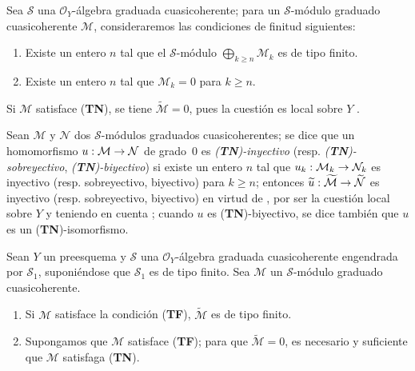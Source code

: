 \documentclass[oneside,10pt]{amsart}
\makeatletter
\renewcommand{\geq}{\geqslant}
\newcommand{\ega@arrow}[2]{\mathchoice{#1}{#2}{#2}{#2}}
\renewcommand{\to}{\ega@arrow{\longrightarrow}{\rightarrow}}
\let\EGAOriginalLabel\label
\renewcommand{\label}[1]{\phantomsection\EGAOriginalLabel{#1}}
\makeatother
\begin{document}
\begin{env}[3.4.2]
\label{II.3.4.2-fr}
Sea $\mathcal{S}$ una $\mathcal{O}_Y$-álgebra graduada cuasicoherente; para un $\mathcal{S}$-módulo graduado cuasicoherente $\mathcal{M}$, consideraremos las condiciones de finitud siguientes:
\begin{enumerate}
  \item[(\textbf{TF})] Existe un entero $n$ tal que el $\mathcal{S}$-módulo $\bigoplus_{k\geq n}\mathcal{M}_k$ es de tipo finito.
  \item[(\textbf{TN})] Existe un entero $n$ tal que $\mathcal{M}_k=0$ para $k\geq n$.
\end{enumerate}

Si $\mathcal{M}$ satisface (\textbf{TN}), se tiene $\widetilde{\mathcal{M}}=0$, pues la cuestión es local sobre $Y$ .

Sean $\mathcal{M}$ y $\mathcal{N}$ dos $\mathcal{S}$-módulos graduados cuasicoherentes; se dice que un homomorfismo $u:\mathcal{M}\to\mathcal{N}$ de grado~$0$ es \emph{(\textbf{TN})-inyectivo} (resp. \emph{(\textbf{TN})-sobreyectivo}, \emph{(\textbf{TN})-biyectivo}) si existe un entero $n$ tal que $u_k:\mathcal{M}_k\to\mathcal{N}_k$ es inyectivo (resp. sobreyectivo, biyectivo) para $k\geq n$; entonces $\widetilde{u}:\widetilde{\mathcal{M}}\to\widetilde{\mathcal{N}}$ es inyectivo (resp. sobreyectivo, biyectivo) en virtud de , por ser la cuestión local sobre $Y$ y teniendo en cuenta ; cuando $u$ es (\textbf{TN})-biyectivo, se dice también que $u$ es un (\textbf{TN})-isomorfismo.
\end{env}

\begin{proposition}[3.4.3]
\label{II.3.4.3-fr}
Sean $Y$ un preesquema y $\mathcal{S}$ una $\mathcal{O}_Y$-álgebra graduada cuasicoherente engendrada por $\mathcal{S}_1$, suponiéndose que $\mathcal{S}_1$ es de tipo finito.
Sea $\mathcal{M}$ un $\mathcal{S}$-módulo graduado cuasicoherente.
\begin{enumerate}
  \item[(i)] Si $\mathcal{M}$ satisface la condición \textup{(\textbf{TF})}, $\widetilde{\mathcal{M}}$ es de tipo finito.
  \item[(ii)] Supongamos que $\mathcal{M}$ satisface \textup{(\textbf{TF})}; para que $\widetilde{\mathcal{M}}=0$, es necesario y suficiente que $\mathcal{M}$ satisfaga \textup{(\textbf{TN})}.
\end{enumerate}
\end{proposition}
\end{document}
